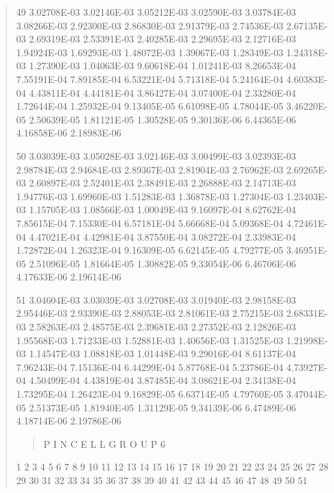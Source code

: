 \documentclass[letterpaper,10pt,english]{sphinxmanual}
\begin{document}
\begin{quote}
\begin{DUlineblock}{0em}
\item[] 49   3.02708E-03  3.02146E-03  3.05212E-03  3.02590E-03  3.03784E-03  3.08266E-03  2.92300E-03  2.86830E-03  2.91379E-03  2.74536E-03  2.67135E-03  2.69319E-03  2.53391E-03  2.40285E-03  2.29695E-03  2.12716E-03  1.94924E-03  1.69293E-03  1.48072E-03  1.39067E-03  1.28349E-03  1.24318E-03  1.27390E-03  1.04063E-03  9.60618E-04  1.01241E-03  8.26653E-04  7.55191E-04  7.89185E-04  6.53221E-04  5.71318E-04  5.24164E-04  4.60383E-04  4.43811E-04  4.44181E-04  3.86427E-04  3.07400E-04  2.33280E-04  1.72644E-04  1.25932E-04  9.13405E-05  6.61098E-05  4.78044E-05  3.46220E-05  2.50639E-05  1.81121E-05  1.30528E-05  9.30136E-06  6.44365E-06  4.16858E-06  2.18983E-06
\item[] 50   3.03039E-03  3.05028E-03  3.02146E-03  3.00499E-03  3.02393E-03  2.98784E-03  2.94684E-03  2.89367E-03  2.81904E-03  2.76962E-03  2.69265E-03  2.60897E-03  2.52401E-03  2.38491E-03  2.26888E-03  2.14713E-03  1.94776E-03  1.69960E-03  1.51283E-03  1.36878E-03  1.27304E-03  1.23403E-03  1.15705E-03  1.08566E-03  1.00049E-03  9.16097E-04  8.62762E-04  7.85615E-04  7.15330E-04  6.57181E-04  5.66668E-04  5.09368E-04  4.72461E-04  4.47021E-04  4.42981E-04  3.87550E-04  3.08272E-04  2.33983E-04  1.72872E-04  1.26323E-04  9.16309E-05  6.62145E-05  4.79277E-05  3.46951E-05  2.51096E-05  1.81664E-05  1.30882E-05  9.33054E-06  6.46706E-06  4.17633E-06  2.19614E-06
\item[] 51   3.04604E-03  3.03039E-03  3.02708E-03  3.01940E-03  2.98158E-03  2.95446E-03  2.93390E-03  2.88053E-03  2.81061E-03  2.75215E-03  2.68331E-03  2.58263E-03  2.48575E-03  2.39681E-03  2.27352E-03  2.12826E-03  1.95568E-03  1.71233E-03  1.52881E-03  1.40656E-03  1.31525E-03  1.21998E-03  1.14547E-03  1.08818E-03  1.01448E-03  9.29016E-04  8.61137E-04  7.96243E-04  7.15136E-04  6.44299E-04  5.87768E-04  5.23786E-04  4.73927E-04  4.50499E-04  4.43819E-04  3.87485E-04  3.08621E-04  2.34138E-04  1.73295E-04  1.26423E-04  9.16829E-05  6.63714E-05  4.79760E-05  3.47044E-05  2.51373E-05  1.81940E-05  1.31129E-05  9.34139E-06  6.47489E-06  4.18714E-06  2.19786E-06
\end{DUlineblock}
\begin{quote}

P I N  C E L L       G R O U P 6
\end{quote}

\begin{DUlineblock}{0em}
\item[] 1        2        3        4        5        6        7        8        9           10           11           12           13           14           15           16           17           18           19           20           21           22           23           24           25           26           27           28           29           30           31           32           33           34           35           36           37           38           39           40           41           42           43           44           45           46           47           48           49           50           51
\end{DUlineblock}


\end{quote}
\end{document}
